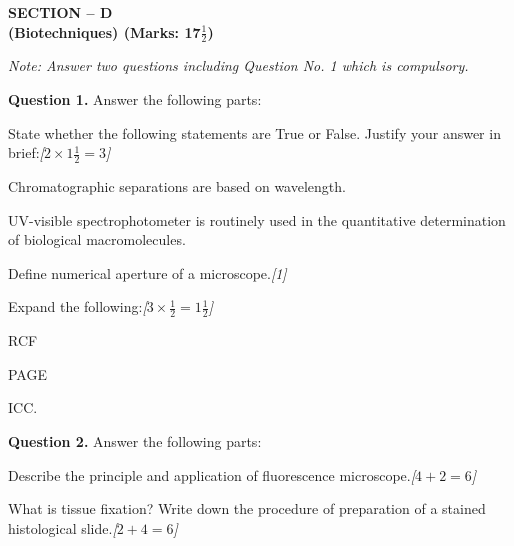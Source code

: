\documentclass[11pt,a4paper]{article}
\newcommand{\pts}[1]{\hfill   \textit{[#1]}}
\begin{document}
\pagebreak

\begin{center}
   \textbf{SECTION -- D} \\
   \textbf{(Biotechniques) (Marks: 17$\frac{1}{2}$)}
\end{center}

\smallskip



\noindent   \textit{Note: Answer two questions including Question No. 1 which is compulsory.}

\medskip


\noindent   \textbf{Question 1.} Answer the following parts:

\begin{parts}
  \item State whether the following statements are True or False. Justify your answer in brief:\pts{$2  \times 1\frac{1}{2} = 3$}
  
\begin{parts}
    \item Chromatographic separations are based on wavelength.
    \item UV-visible spectrophotometer is routinely used in the quantitative determination of biological macromolecules.
  \end{parts}

  \item Define numerical aperture of a microscope.\pts{1}

  \item Expand the following:\pts{$3  \times \frac{1}{2} = 1\frac{1}{2}$}
  
\begin{parts}
    \item RCF
    \item PAGE
    \item ICC.
  \end{parts}
\end{parts}

\medskip


\noindent   \textbf{Question 2.} Answer the following parts:

\begin{parts}
  \item Describe the principle and application of fluorescence microscope.\pts{$4 + 2 = 6$}
  \item What is tissue fixation? Write down the procedure of preparation of a stained histological slide.\pts{$2 + 4 = 6$}
\end{parts}
\end{document}
